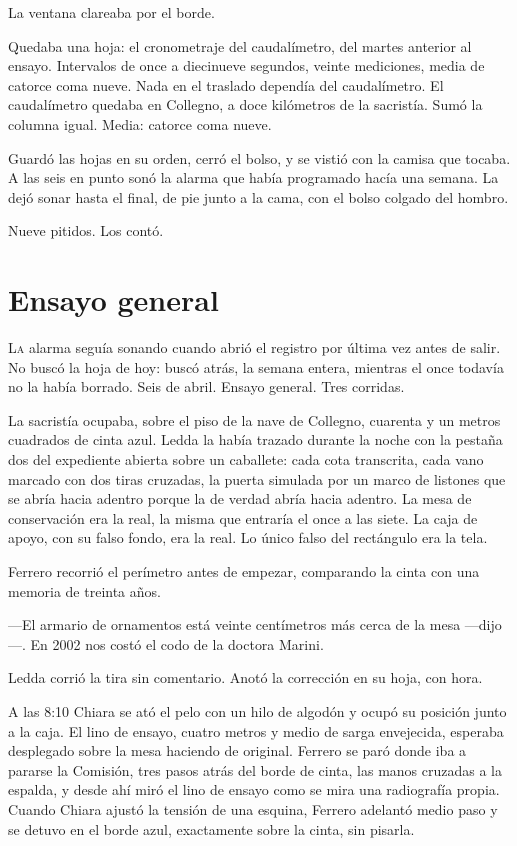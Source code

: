 La ventana clareaba por el borde.

Quedaba una hoja: el cronometraje del caudalímetro, del martes anterior al ensayo. Intervalos de once a diecinueve segundos, veinte mediciones, media de catorce coma nueve. Nada en el traslado dependía del caudalímetro. El caudalímetro quedaba en Collegno, a doce kilómetros de la sacristía. Sumó la columna igual. Media: catorce coma nueve.

Guardó las hojas en su orden, cerró el bolso, y se vistió con la camisa que tocaba. A las seis en punto sonó la alarma que había programado hacía una semana. La dejó sonar hasta el final, de pie junto a la cama, con el bolso colgado del hombro.

Nueve pitidos. Los contó.

\clearpage

\chapter{Ensayo general}

\lettrine[lines=2, lhang=0.1, nindent=0.2em]{L}{a} alarma seguía sonando cuando abrió el registro por última vez antes de salir. No buscó la hoja de hoy: buscó atrás, la semana entera, mientras el once todavía no la había borrado. Seis de abril. Ensayo general. Tres corridas.


La sacristía ocupaba, sobre el piso de la nave de Collegno, cuarenta y un metros cuadrados de cinta azul. Ledda la había trazado durante la noche con la pestaña dos del expediente abierta sobre un caballete: cada cota transcrita, cada vano marcado con dos tiras cruzadas, la puerta simulada por un marco de listones que se abría hacia adentro porque la de verdad abría hacia adentro. La mesa de conservación era la real, la misma que entraría el once a las siete. La caja de apoyo, con su falso fondo, era la real. Lo único falso del rectángulo era la tela.

Ferrero recorrió el perímetro antes de empezar, comparando la cinta con una memoria de treinta años.

---El armario de ornamentos está veinte centímetros más cerca de la mesa ---dijo---. En 2002 nos costó el codo de la doctora Marini.

Ledda corrió la tira sin comentario. Anotó la corrección en su hoja, con hora.

A las 8:10 Chiara se ató el pelo con un hilo de algodón y ocupó su posición junto a la caja. El lino de ensayo, cuatro metros y medio de sarga envejecida, esperaba desplegado sobre la mesa haciendo de original. Ferrero se paró donde iba a pararse la Comisión, tres pasos atrás del borde de cinta, las manos cruzadas a la espalda, y desde ahí miró el lino de ensayo como se mira una radiografía propia. Cuando Chiara ajustó la tensión de una esquina, Ferrero adelantó medio paso y se detuvo en el borde azul, exactamente sobre la cinta, sin pisarla.

